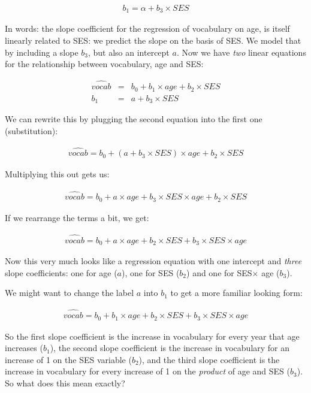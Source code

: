 \documentclass[]{book}\usepackage[]{graphicx}\usepackage[]{color}
\begin{document}
\begin{eqnarray}
b_1 = \alpha + b_3 \times SES
\end{eqnarray}

In words: the slope coefficient for the regression of vocabulary on age, is itself linearly related to SES: we predict the slope on the basis of SES. We model that by including a slope $b_3$, but also an intercept $a$. Now we have \textit{two} linear equations for the relationship between vocabulary, age and SES:

\begin{eqnarray}
\widehat{vocab} &=& b_0 + b_1 \times age + b_2 \times SES  \\
b_1 &=& a + b_3 \times SES
\end{eqnarray}

We can rewrite this by plugging the second equation into the first one (substitution):

\begin{eqnarray}
\widehat{vocab} = b_0 + (a + b_3 \times SES)  \times age + b_2 \times SES 
\end{eqnarray}


Multiplying this out gets us:

\begin{eqnarray}
\widehat{vocab} = b_0 + a \times age + b_3 \times SES  \times age + b_2 \times SES
\end{eqnarray}

If we rearrange the terms a bit, we get:

\begin{eqnarray}
\widehat{vocab} = b_0 + a \times age + b_2 \times SES + b_3 \times SES  \times age
\end{eqnarray}

Now this very much looks like a regression equation with one intercept and \textit{three} slope coefficients: one for age ($a$), one for SES ($b_2$) and one for SES$\times$ age ($b_3$).


We might want to change the label $a$ into $b_1$ to get a more familiar looking form:

\begin{eqnarray}
\widehat{vocab} = b_0 + b_1\times age + b_2 \times SES + b_3 \times SES  \times age
\end{eqnarray}

So the first slope coefficient is the increase in vocabulary for every year that age increases ($b_1$), the second slope coefficient is the increase in vocabulary for an increase of 1 on the SES variable ($b_2$), and the third slope coefficient is the increase in vocabulary for every increase of 1 on the \textit{product} of age and SES ($b_3$).
\\
So what does this mean exactly?
\end{document}
